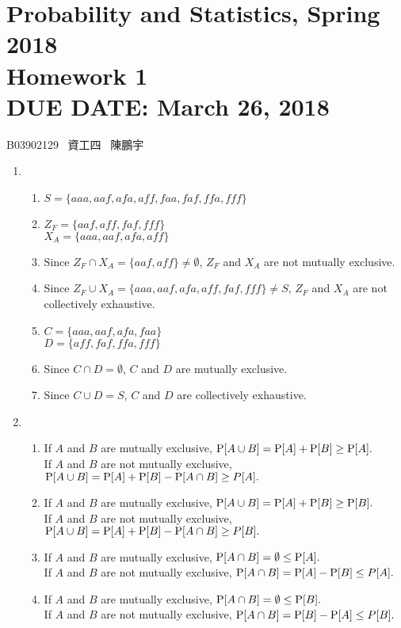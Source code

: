 \documentclass{article}
\newcommand{\hmwkClass}{Probability and Statistics, Spring 2018}
\newcommand{\hmwkTitle}{Homework 1}
\newcommand{\hmwkDueDate}{March 26, 2018}
\begin{document}
\thispagestyle{empty}
\section*{\hmwkClass \\
    \normalsize{\hmwkTitle} \\
    \normalsize{DUE DATE: \hmwkDueDate}
}

\hfill{B03902129 \, 資工四 \, 陳鵬宇}

\begin{enumerate}
    \item [\textbf{1.1.3}]
    \begin{enumerate}[label=(\alph*)]
        \item $S = \{aaa, aaf, afa, aff, faa, faf, ffa, fff\}$
        \item $Z_F = \{aaf, aff, faf, fff\}$ \\
              $X_A = \{aaa, aaf, afa, aff\}$
        \item Since $Z_F \cap X_A = \{aaf, aff\} \ne \emptyset$, $Z_F$ and $X_A$ are not mutually   exclusive. 
        \item Since $Z_F \cup X_A = \{aaa, aaf, afa, aff, faf, fff\} \ne S$, $Z_F$ and $X_A$ are not    collectively exhaustive.
        \item $C = \{aaa, 
        aaf, afa, faa\}$ \\
              $D = \{aff, faf, ffa, fff\}$
        \item Since $C \cap D = \emptyset$, $C$ and $D$ are mutually exclusive. 
        \item Since $C \cup D = S$, $C$ and $D$ are collectively exhaustive.      
    \end{enumerate}

    \item [\textbf{1.2.10}]
    \begin{enumerate}[label=(\alph*)]
        \item 
        If $A$ and $B$ are mutually exclusive, $\mbox P[A \cup B] = \mbox P[A] + \mbox P[B] \ge \mbox P[A].$ \\
        If $A$ and $B$ are not mutually exclusive, $\mbox P[A \cup B] = \mbox P[A] + \mbox P[B] - \mbox P[A \cap B] \ge P[A].$
        \item 
        If $A$ and $B$ are mutually exclusive, $\mbox P[A \cup B] = \mbox P[A] + \mbox P[B] \ge \mbox P[B].$ \\
        If $A$ and $B$ are not mutually exclusive, $\mbox P[A \cup B] = \mbox P[A] + \mbox P[B] - \mbox P[A \cap B] \ge P[B].$
        \item 
        If $A$ and $B$ are mutually exclusive, $\mbox P[A \cap B] = \emptyset \le \mbox P[A].$ \\
        If $A$ and $B$ are not mutually exclusive, $\mbox P[A \cap B] = \mbox P[A] - \mbox P[B] \le P[A].$
        \item 
        If $A$ and $B$ are mutually exclusive, $\mbox P[A \cap B] = \emptyset \le \mbox P[B].$ \\
        If $A$ and $B$ are not mutually exclusive, $\mbox P[A \cap B] = \mbox P[B] - \mbox P[A] \le P[B].$
    \end{enumerate}


\end{enumerate}
\end{document}
